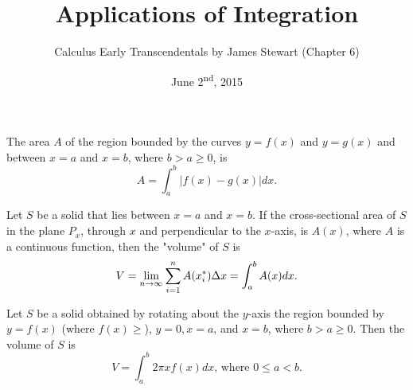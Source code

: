 \documentclass[a4paper,11pt]{article}
\title{Applications of Integration}
\author{Calculus Early Transcendentals by James Stewart (Chapter 6)}
\date{June 2\textsuperscript{nd}, 2015}
\begin{document}
\maketitle
{}

\begin{outline}

    The area \(A\) of the region bounded by the curves \(y = f(x)\) and \(y = g(x)\) and between \(x=a\) and \(x=b\),
    where \(b > a \geq 0\), is \[ A = \int_a^b |f(x)-g(x)|dx\text{.} \]
    
    Let \(S\) be a solid that lies between \(x = a\) and \(x = b\). If the cross-sectional area of \(S\) in the
    plane \(P_x\), through \(x\) and perpendicular to the \(x\)-axis, is \(A(x)\), where \(A\) is a continuous function,
    then the "volume" of \(S\) is \[V = \lim\limits_{n\rightarrow \infty^{}} \sum_{i=1}^n A(x_i^*)\Delta x = \int_a^bA(x)dx\text{.}\]
    
    Let \(S\) be a solid obtained by rotating about the \(y\)-axis the region bounded by \(y = f(x)\) (where \(f(x)
    \geq \)), \(y = 0, x = a\), and \(x = b\), where \(b > a \geq 0\). Then the volume of \(S\) is 
    \[ V= \int_a^b 2\pi x f(x)dx\text{, where } 0 \leq a < b\text{.} \]
    

\end{outline}
\end{document}
